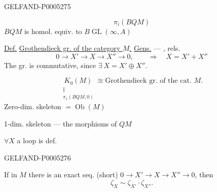 \begin{GelfandAdjacentEvidence}{GELFAND-P000527}{5}

\[
\pi_i(BQM)
\]
$BQM$ is homol. equiv. to $B\operatorname{GL}(\infty,A)$

\uline{Def.} \uline{Grothendieck gr. of the category \mbox{$M$}.}
\uline{Gens.} — , rels.
\[
0\to X'\to X\to X''\to0,\qquad\Rightarrow\quad X=X'+X''
\]
The gr. is commutative, since $\exists\ X=X'\oplus X''$.

\[
\underset{\substack{\Vert\\\pi_1(BQM,0)}}{K_0(M)}\cong
\text{Grothendieck gr. of the cat. }M.
\]
Zero-dim. skeleton $=\operatorname{Ob}(M)$

1-dim. skeleton — the morphisms of $QM$

$\forall X$ a loop is def.
\end{GelfandAdjacentEvidence}
\begin{GelfandAdjacentEvidence}{GELFAND-P000527}{6}


If in $M$ there is an exact seq. (short) $0\to X'\to X\to X''\to0$,
then
\[
\zeta_X\sim\zeta_{X'}\cdot\zeta_{X''}.
\]
\end{GelfandAdjacentEvidence}
